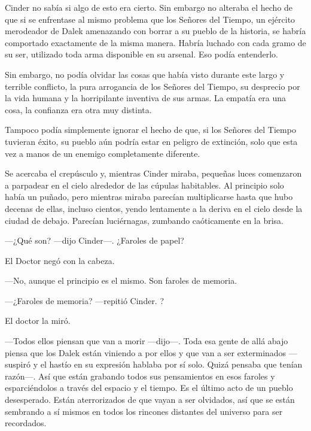 Cinder no sabía si algo de esto era cierto. Sin embargo no alteraba el hecho de que si se enfrentase al mismo problema que los Señores del Tiempo, un ejército merodeador de Dalek amenazando con borrar a su pueblo de la historia, se habría comportado exactamente de la misma manera. Habría luchado con cada gramo de su ser, utilizado toda arma disponible en su arsenal. Eso podía entenderlo. 

Sin embargo, no podía olvidar las cosas que había visto durante este largo y terrible conflicto, la pura arrogancia de los Señores del Tiempo, su desprecio por la vida humana y la horripilante inventiva de sus armas. La empatía era una cosa, la confianza era otra muy distinta. 

Tampoco podía simplemente ignorar el hecho de que, si los Señores del Tiempo tuvieran éxito, su pueblo aún podría estar en peligro de extinción, solo que esta vez a manos de un enemigo completamente diferente. 

Se acercaba el crepúsculo y, mientras Cinder miraba, pequeñas luces comenzaron a parpadear en el cielo alrededor de las cúpulas habitables. Al principio solo había un puñado, pero mientras miraba parecían multiplicarse hasta que hubo decenas de ellas, incluso cientos, yendo lentamente a la deriva en el cielo desde la ciudad de debajo. Parecían luciérnagas, zumbando caóticamente en la brisa. 



—¿Qué son? —dijo Cinder—. ¿Faroles de papel? 

El Doctor negó con la cabeza. 



—No, aunque el principio es el mismo. Son faroles de memoria. 



—¿Faroles de memoria? —repitió Cinder. ?



El doctor la miró. 



—Todos ellos piensan que van a morir —dijo—. Toda esa gente de allá abajo piensa que los Dalek están viniendo a por ellos y que van a ser exterminados —suspiró y el hastío en su expresión hablaba por sí solo. Quizá pensaba que tenían razón—. Así que están grabando todos sus pensamientos en esos faroles y esparciéndolos a través del espacio y el tiempo. Es el último acto de un pueblo desesperado. Están aterrorizados de que vayan a ser olvidados, así que se están sembrando a sí mismos en todos los rincones distantes del universo para ser recordados. 



